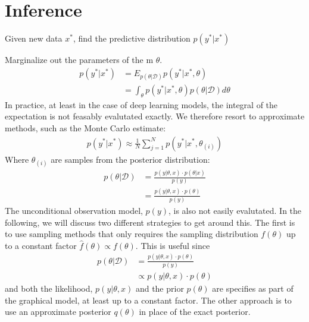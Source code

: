 
\chapter{Inference}

Given new data $x^\ast$, find the predictive distribution $p(y^\ast | x^\ast)$ 


Marginalize out the parameters of the m $\theta$.
\begin{align*}
    p(y^\ast | x^\ast) &= E_{p(\theta|\mathcal{D})} p(y^\ast | x^\ast, \theta) \\
                       &= \int_{\theta} p(y^\ast | x^\ast, \theta)  p(\theta|\mathcal{D}) d\theta
\end{align*}
In practice, at least in the case of deep learning models, the integral of the expectation is not feasably evalutated exactly. 
We therefore resort to approximate methods, such as the Monte Carlo estimate:
\begin{align*}
    p(y^\ast | x^\ast)  \approx \frac{1}{N} \sum_{j=1}^N p(y^\ast | x^\ast, \theta_{(i)}) 
\end{align*}
Where $\theta_{(i)}$ are samples from the posterior distribution:
\begin{align*}
    p(\theta | \mathcal{D}) &= \frac{p(y |\theta, x) \cdot p(\theta|x)}{p(y) } \\
                     &= \frac{p(y |\theta, x) \cdot p(\theta)}{p(y) } 
\end{align*}
The unconditional  observation model, $p(y)$, is also not easily evalutated. 
In the following, we will discuss two different strategies to get around this. 
The first is to use sampling methods that only requires the sampling distribution $f(\theta)$ up to a constant factor $\hat{f}(\theta)\propto f(\theta)$. 
This is useful since 
\begin{align*}
    p(\theta | \mathcal{D}) &= \frac{p(y |\theta, x) \cdot p(\theta)}{p(y) } \\
                        &\propto p(y |\theta, x) \cdot p(\theta) 
\end{align*}
and both the likelihood, $p(y |\theta, x)$ and the prior $p(\theta) $ are specifies as part of the graphical model, at least up to a constant factor. 
The other approach is to use an approximate posterior $q(\theta)$ in place of the exact posterior.

